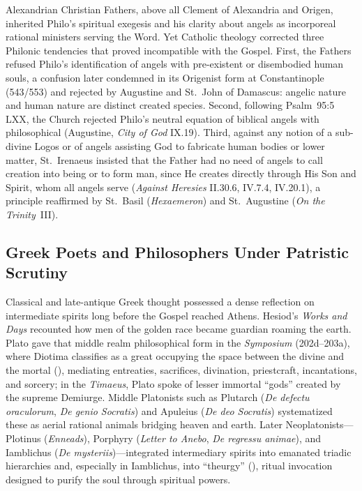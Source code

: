 Alexandrian Christian Fathers, above all Clement of Alexandria and Origen, inherited Philo's spiritual exegesis and his clarity about angels as incorporeal rational ministers serving the Word. Yet Catholic theology corrected three Philonic tendencies that proved incompatible with the Gospel. First, the Fathers refused Philo's identification of angels with pre-existent or disembodied human souls, a confusion later condemned in its Origenist form at Constantinople (543/553) and rejected by Augustine and St.~John of Damascus: angelic nature and human nature are distinct created species. Second, following Psalm~95:5 LXX, the Church rejected Philo's neutral equation of biblical angels with philosophical  (Augustine, \emph{City of God} IX.19). Third, against any notion of a sub-divine Logos or of angels assisting God to fabricate human bodies or lower matter, St.~Irenaeus insisted that the Father had no need of angels to call creation into being or to form man, since He creates directly through His Son and Spirit, whom all angels serve (\emph{Against Heresies} II.30.6, IV.7.4, IV.20.1), a principle reaffirmed by St.~Basil (\emph{Hexaemeron}) and St.~Augustine (\emph{On the Trinity}~III).

\subsection{Greek Poets and Philosophers Under Patristic Scrutiny}
\label{subsec:greek-philosophers}

Classical and late-antique Greek thought possessed a dense reflection on intermediate spirits long before the Gospel reached Athens. Hesiod's \emph{Works and Days} recounted how men of the golden race became guardian  roaming the earth. Plato gave that middle realm philosophical form in the \emph{Symposium} (202d--203a), where Diotima classifies  as a great  occupying the space between the divine and the mortal (), mediating entreaties, sacrifices, divination, priestcraft, incantations, and sorcery; in the \emph{Timaeus}, Plato spoke of lesser immortal ``gods'' created by the supreme Demiurge. Middle Platonists such as Plutarch (\emph{De defectu oraculorum}, \emph{De genio Socratis}) and Apuleius (\emph{De deo Socratis}) systematized these  as aerial rational animals bridging heaven and earth. Later Neoplatonists---Plotinus (\emph{Enneads}), Porphyry (\emph{Letter to Anebo}, \emph{De regressu animae}), and Iamblichus (\emph{De mysteriis})---integrated intermediary spirits into emanated triadic hierarchies and, especially in Iamblichus, into ``theurgy'' (), ritual invocation designed to purify the soul through spiritual powers.


